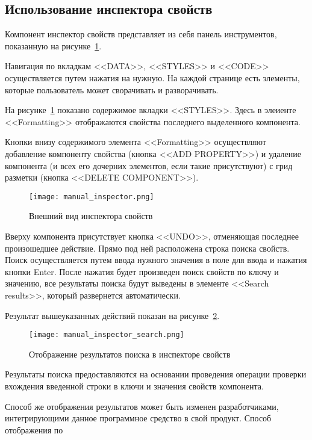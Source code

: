 \subsection{Использование инспектора свойств}
\label{sec:manual:inspector_manual}

Компонент инспектор свойств представляет из себя панель инструментов, показанную на рисунке~\ref{sec:manual:inspector}.

Навигация по вкладкам <<DATA>>, <<STYLES>> и <<CODE>> осуществляется путем нажатия на нужную. На каждой странице есть элементы, которые пользователь может сворачивать и разворачивать.

На рисунке~\ref{sec:manual:inspector} показано содержимое вкладки <<STYLES>>. Здесь в элеиенте <<Formatting>> отображаются свойства последнего выделенного компонента.

Кнопки внизу содержимого элемента <<Formatting>> осуществляют добавление компоненту свойства (кнопка <<ADD PROPERTY>>) и удаление компонента (и всех его дочерних элементов, если такие присутствуют) с грид разметки (кнопка <<DELETE COMPONENT>>).

\begin{figure}[ht]
  \centering
    \texttt{[image: manual\_inspector.png]}
    \caption{Внешний вид инспектора свойств}
    \label{sec:manual:inspector}
\end{figure}
  
Вверху компонента присутствует кнопка <<UNDO>>, отменяющая последнее произошедшее действие. Прямо под ней расположена строка поиска свойств. Поиск осуществляется путем ввода нужного значения в поле для ввода и нажатия кнопки Enter. После нажатия будет произведен поиск свойств по ключу и значению, все результаты поиска будут выведены в элементе <<Search results>>, который развернется автоматически.

Результат вышеуказанных действий показан на рисунке~\ref{sec:manual:inspector_search_manual}.\pagebreak

\begin{figure}[ht]
  \centering
    \texttt{[image: manual\_inspector\_search.png]}
    \caption{Отображение результатов поиска в инспекторе свойств}
    \label{sec:manual:inspector_search_manual}
\end{figure}

Результаты поиска предоставляются на основании проведения операции проверки вхождения введенной строки в ключи и значения свойств компонента. 

Способ же отображения результатов может быть изменен разработчиками, интегрирующими данное программное средство в свой продукт. Способ отображения по 

